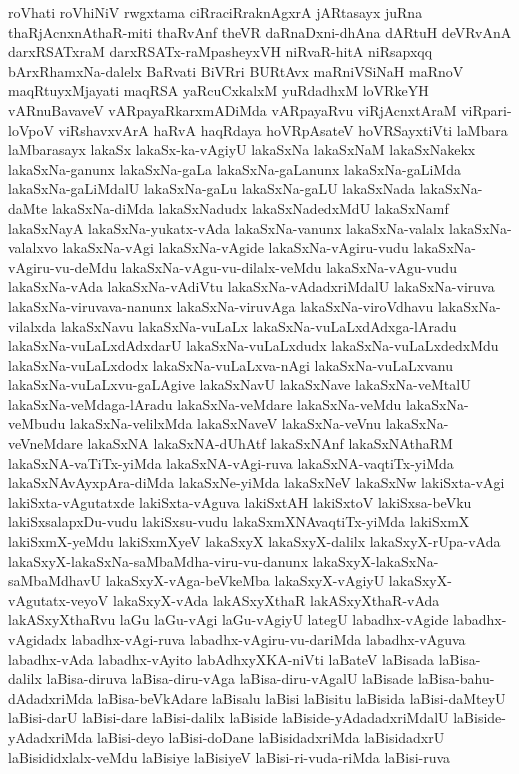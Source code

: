 {roVhati
roVhiNiV
rwgxtama
ciRraciRraknAgxrA
jARtasayx
juRna
thaRjAcnxnAthaR-miti
thaRvAnf
theVR
daRnaDxni-dhAna
dARtuH
deVRvAnA
darxRSATxraM
darxRSATx-raMpasheyxVH
niRvaR-hitA
niRsapxqq
bArxRhamxNa-dalelx
BaRvati
BiVRri
BURtAvx
maRniVSiNaH
maRnoV
maqRtuyxMjayati
maqRSA
yaRcuCxkalxM
yuRdadhxM
loVRkeYH
vARnuBavaveV
vARpayaRkarxmADiMda
vARpayaRvu
viRjAcnxtAraM
viRpari-loVpoV
viRshavxvArA
haRvA
haqRdaya
hoVRpAsateV
hoVRSayxtiVti
laMbara
laMbarasayx
lakaSx
lakaSx-ka-vAgiyU
lakaSxNa
lakaSxNaM
lakaSxNakekx
lakaSxNa-ganunx
lakaSxNa-gaLa
lakaSxNa-gaLanunx
lakaSxNa-gaLiMda
lakaSxNa-gaLiMdalU
lakaSxNa-gaLu
lakaSxNa-gaLU
lakaSxNada
lakaSxNa-daMte
lakaSxNa-diMda
lakaSxNadudx
lakaSxNadedxMdU
lakaSxNamf
lakaSxNayA
lakaSxNa-yukatx-vAda
lakaSxNa-vanunx
lakaSxNa-valalx
lakaSxNa-valalxvo
lakaSxNa-vAgi
lakaSxNa-vAgide
lakaSxNa-vAgiru-vudu
lakaSxNa-vAgiru-vu-deMdu
lakaSxNa-vAgu-vu-dilalx-veMdu
lakaSxNa-vAgu-vudu
lakaSxNa-vAda
lakaSxNa-vAdiVtu
lakaSxNa-vAdadxriMdalU
lakaSxNa-viruva
lakaSxNa-viruvava-nanunx
lakaSxNa-viruvAga
lakaSxNa-viroVdhavu
lakaSxNa-vilalxda
lakaSxNavu
lakaSxNa-vuLaLx
lakaSxNa-vuLaLxdAdxga-lAradu
lakaSxNa-vuLaLxdAdxdarU
lakaSxNa-vuLaLxdudx
lakaSxNa-vuLaLxdedxMdu
lakaSxNa-vuLaLxdodx
lakaSxNa-vuLaLxva-nAgi
lakaSxNa-vuLaLxvanu
lakaSxNa-vuLaLxvu-gaLAgive
lakaSxNavU
lakaSxNave
lakaSxNa-veMtalU
lakaSxNa-veMdaga-lAradu
lakaSxNa-veMdare
lakaSxNa-veMdu
lakaSxNa-veMbudu
lakaSxNa-velilxMda
lakaSxNaveV
lakaSxNa-veVnu
lakaSxNa-veVneMdare
lakaSxNA
lakaSxNA-dUhAtf
lakaSxNAnf
lakaSxNAthaRM
lakaSxNA-vaTiTx-yiMda
lakaSxNA-vAgi-ruva
lakaSxNA-vaqtiTx-yiMda
lakaSxNAvAyxpAra-diMda
lakaSxNe-yiMda
lakaSxNeV
lakaSxNw
lakiSxta-vAgi
lakiSxta-vAgutatxde
lakiSxta-vAguva
lakiSxtAH
lakiSxtoV
lakiSxsa-beVku
lakiSxsalapxDu-vudu
lakiSxsu-vudu
lakaSxmXNAvaqtiTx-yiMda
lakiSxmX
lakiSxmX-yeMdu
lakiSxmXyeV
lakaSxyX
lakaSxyX-dalilx
lakaSxyX-rUpa-vAda
lakaSxyX-lakaSxNa-saMbaMdha-viru-vu-danunx
lakaSxyX-lakaSxNa-saMbaMdhavU
lakaSxyX-vAga-beVkeMba
lakaSxyX-vAgiyU
lakaSxyX-vAgutatx-veyoV
lakaSxyX-vAda
lakASxyXthaR
lakASxyXthaR-vAda
lakASxyXthaRvu
laGu
laGu-vAgi
laGu-vAgiyU
lategU
labadhx-vAgide
labadhx-vAgidadx
labadhx-vAgi-ruva
labadhx-vAgiru-vu-dariMda
labadhx-vAguva
labadhx-vAda
labadhx-vAyito
labAdhxyXKA-niVti
laBateV
laBisada
laBisa-dalilx
laBisa-diruva
laBisa-diru-vAga
laBisa-diru-vAgalU
laBisade
laBisa-bahu-dAdadxriMda
laBisa-beVkAdare
laBisalu
laBisi
laBisitu
laBisida
laBisi-daMteyU
laBisi-darU
laBisi-dare
laBisi-dalilx
laBiside
laBiside-yAdadadxriMdalU
laBiside-yAdadxriMda
laBisi-deyo
laBisi-doDane
laBisidadxriMda
laBisidadxrU
laBisididxlalx-veMdu
laBisiye
laBisiyeV
laBisi-ri-vuda-riMda
laBisi-ruva
}
